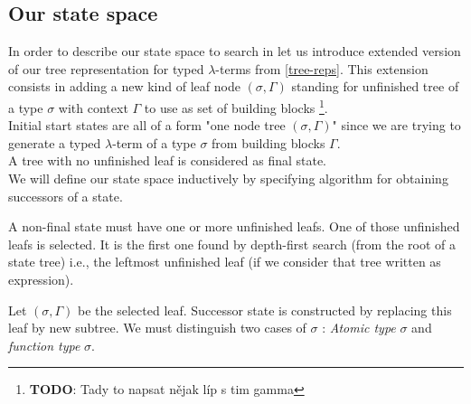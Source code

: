 \documentclass[12pt,a4paper]{report}
\newcommand{\lets}{let us\xspace}
\newcommand{\lterm}{$\lambda$-term\xspace}
\newcommand{\lterms}{$\lambda$-terms\xspace}
\begin{document}
\subsection{Our state space}




In order to describe our state space to search in \lets introduce
extended version of our tree representation for typed \lterms from \ref{tree-reps}.
This extension consists in adding a new kind of leaf node $(\sigma,\Gamma)$ 
standing for unfinished tree of a type $\sigma$ with context $\Gamma$ to use
as set of building blocks
\footnote{\textbf{TODO}: Tady to napsat nějak líp s tim gamma }.\\

Initial start states are all of a form "one node tree $(\sigma,\Gamma)$" since we
are trying to generate a typed \lterm of a type $\sigma$ from building blocks $\Gamma$.\\

A tree with no unfinished leaf is considered as final state.  \\

We will define our state space inductively by specifying algorithm for obtaining 
successors of a state.

A non-final state must have one or more unfinished leafs. 
One of those unfinished leafs is selected. 
It is the first one found by depth-first search (from the root of a state tree)
i.e., the leftmost unfinished leaf (if we consider that tree written as expression).

Let $(\sigma,\Gamma)$ be the selected leaf. Successor state is constructed 
by replacing this leaf by new subtree. We must distinguish two cases of $\sigma$ :
\textit{Atomic type} $\sigma$ and \textit{function type} $\sigma$.\\
\end{document}
